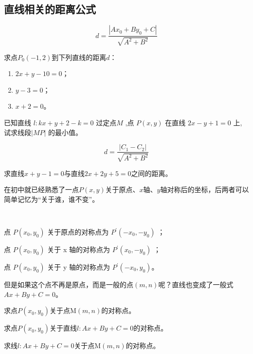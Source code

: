\subsection{直线相关的距离公式}
\begin{theorem}
    \begin{equation}
          d=\frac{|Ax_0+By_0+C|}{\sqrt{A^2+B^2}}
    \end{equation}
\end{theorem}
\begin{exercise}
    求点\(P_0(-1,2)\)到下列直线的距离\(d\)：
    \begin{enumerate}
        \setlength{\itemsep}{-\itemsep}
        \item \(2x+y-10=0\)；
        \item \(y-3=0\)；
        \item \(x+2=0\)。
    \end{enumerate}
\end{exercise}
\begin{example}
    已知直线 $ l: k x+y+2-k=0 $ 过定点$  M$ ,点 $ P(x, y)$  在直线 $ 2 x-y+1=0$  上, 试求线段$  |M P| $ 的最小值。
\end{example}
\begin{theorem}
    \begin{equation}
          d=\frac{|C_1-C_2|}{\sqrt{A^2+B^2}}
    \end{equation}
\end{theorem}
\begin{exercise}
    求直线\(x+y-1=0\)与直线\(2x+2y+5=0\)之间的距离。
\end{exercise}
在初中就已经熟悉了一点\(P(x,y)\)关于原点、\(x\)轴、\(y\)轴对称后的坐标，后两者可以简单记忆为“关于谁，谁不变”。
\begin{character}
    \ 

 点 $ P\left(x_{0}, y_{0}\right)$ 关于原点的对称点为 $P^{\prime}\left(-x_{0},-y_{0}\right)$ ；

 点  $P\left(x_{0}, y_{0}\right)$  关于  x  轴的对称点为 $ P^{\prime}\left(x_{0},-y_{0}\right)$ ；

  点 $ P\left(x_{0}, y_{0}\right)$  关于  y  轴的对称点为  $P^{\prime}\left(-x_{0}, y_{0}\right) $。
\end{character}

但是如果这个点不再是原点，而是一般的点\((m,n)\)呢？直线也变成了一般式\(Ax+By+C=0\)。
\begin{example}
    求点\(P(x_0,y_0)\)关于点M\((m,n)\)的对称点。
\end{example}
\begin{example}
    求点\(P(x_0,y_0)\)关于直线\(l:Ax+By+C=0\)的对称点。
\end{example}
\begin{example}
    求线\(l:Ax+By+C=0\)关于点M\((m,n)\)的对称点。
\end{example}

